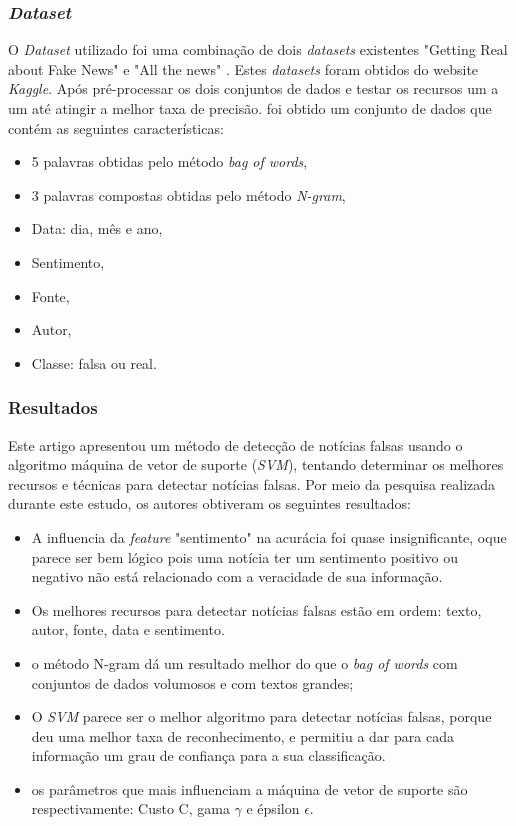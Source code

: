 \subsubsection{\textit{Dataset}}

O \textit{Dataset} utilizado foi uma combinação de dois \textit{datasets} existentes  "Getting Real about
Fake News" \cite{fakenews2016} e "All the news" \cite{allthenews2017}. Estes \textit{datasets} foram obtidos do website \textit{Kaggle}. Após pré-processar os dois conjuntos de dados e testar os recursos um a um até atingir a melhor taxa de precisão. foi obtido um conjunto de dados que contém as seguintes características:

\begin{itemize}
    \item 5 palavras obtidas pelo método \textit{bag of words},
    \item 3 palavras compostas obtidas pelo método \textit{N-gram},
    \item Data: dia, mês e ano,
    \item Sentimento,
    \item Fonte,
    \item Autor,
    \item Classe: falsa ou real. \\
\end{itemize}

\subsubsection{Resultados}
Este artigo apresentou um método de detecção de notícias falsas usando o algoritmo máquina de vetor de suporte (\textit{SVM}), tentando determinar os melhores recursos e técnicas para detectar notícias falsas. Por meio da pesquisa realizada durante este estudo, os autores obtiveram os seguintes resultados: \\

\begin{itemize}
    \item A influencia da \textit{feature} "sentimento" na acurácia foi quase insignificante, oque parece ser bem lógico pois uma notícia ter um sentimento positivo ou negativo não está relacionado com a veracidade de sua informação.
    \item Os melhores recursos para detectar notícias falsas estão em ordem: texto, autor, fonte, data e sentimento.
    \item o método N-gram dá um resultado melhor do que o \textit{bag of words} com conjuntos de dados volumosos e com textos grandes;
    \item O \textit{SVM} parece ser o melhor algoritmo para detectar notícias falsas, porque deu uma melhor taxa de reconhecimento, e permitiu a dar para cada informação um grau de confiança para a sua classificação.
    \item os parâmetros que mais influenciam a máquina de vetor de suporte são respectivamente: Custo C, gama $\gamma$ e épsilon $\epsilon$. \\
\end{itemize}
